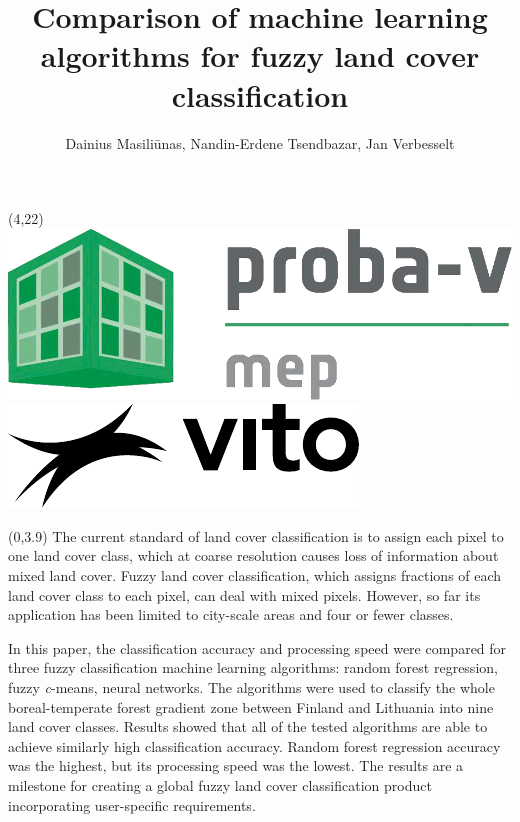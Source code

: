 \documentclass[20pt]{beamer}
\title{Comparison of machine learning algorithms for fuzzy land cover classification}
\author{Dainius Masiliūnas, Nandin-Erdene Tsendbazar, Jan Verbesselt}
\begin{document}
  \beamertemplatenavigationsymbolsempty
  \begin{frame}{} 

	\begin{textblock}{15}(4,22)
		\includegraphics[height=0.5\TPVertModule]{figures/PVMEP.png} \hskip 1cm
		\includegraphics[height=0.5\TPVertModule]{figures/vito-black}
	\end{textblock}

	\begin{textblock}{7}(0,3.9)
	  \Line
	  The current standard of land cover classification is to assign each pixel to one land cover class, which at coarse resolution causes loss of information about mixed land cover. Fuzzy land cover classification, which assigns fractions of each land cover class to each pixel, can deal with mixed pixels. However, so far its application has been limited to city-scale areas and four or fewer classes.
	  
	  In this paper, the classification accuracy and processing speed were compared for three fuzzy classification machine learning algorithms: random forest regression, fuzzy \textit{c}-means, neural networks. The algorithms were used to classify the whole boreal-temperate forest gradient zone between Finland and Lithuania into nine land cover classes. Results showed that all of the tested algorithms are able to achieve similarly high classification accuracy. Random forest regression accuracy was the highest, but its processing speed was the lowest. The results are a milestone for creating a global fuzzy land cover classification product incorporating user-specific requirements.
	
	\end{textblock}
	

\end{frame}
\end{document}
